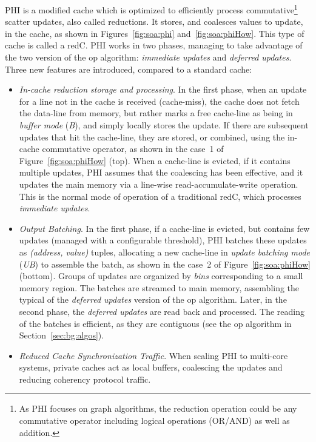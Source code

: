 PHI is a modified cache which is optimized to efficiently process commutative\footnote{As PHI focuses on graph algorithms, the \gls{reduction} operation could be any commutative operator including logical operations (OR/AND) as well as addition.} \gls{scatter} updates, also called \glspl{reduction}.
It stores, and coalesces values to update, in the cache, as shown in Figures~\ref{fig:soa:phi} and~\ref{fig:soa:phiHow}.
This type of cache is called a \gls{redC}.
PHI works in two phases, managing to take advantage of the two version of the \acrshort{op} algorithm: \textit{immediate updates} and \textit{deferred updates}.
Three new features are introduced, compared to a standard cache:
\begin{itemize}
    \item \textit{In-cache \gls{reduction} storage and processing}.
    In the first phase, when an update for a line not in the cache is received (cache-\gls{miss}), the cache does not fetch the data-line from memory, but rather marks a free cache-line as being in \textit{buffer mode} (\textit{B}), and simply locally stores the update.
    If there are subsequent updates that \gls{hit} the cache-line, they are stored, or combined, using the in-cache commutative operator, as shown in the case~1 of Figure~\ref{fig:soa:phiHow} (top).
    When a cache-line is evicted, if it contains multiple updates, PHI assumes that the coalescing has been effective, and it updates the main memory via a line-wise read-accumulate-write operation.
    This is the normal mode of operation of a traditional \gls{redC}, which processes \textit{immediate updates}.
    \item \textit{Output Batching}.
    In the first phase, if a cache-line is evicted, but contains few updates (managed with a configurable threshold), PHI batches these updates as \textit{(address, value)} tuples, allocating a new cache-line in \textit{update batching mode} (\textit{UB}) to assemble the batch, as shown in the case~2 of Figure~\ref{fig:soa:phiHow} (bottom).
    Groups of updates are organized by \textit{bins} corresponding to a small memory region.
    The batches are streamed to main memory, assembling the  typical of the \textit{deferred updates} version of the \acrshort{op} algorithm.
    Later, in the second phase, the \textit{deferred updates} are read back and processed.
    The reading of the batches is efficient, as they are contiguous (see the \acrshort{op} algorithm in Section~\ref{sec:bg:algos}).
    \item \textit{Reduced Cache Synchronization Traffic}.
    When scaling PHI to multi-core systems, private caches act as local buffers, coalescing the updates and reducing coherency protocol traffic.
\end{itemize}

